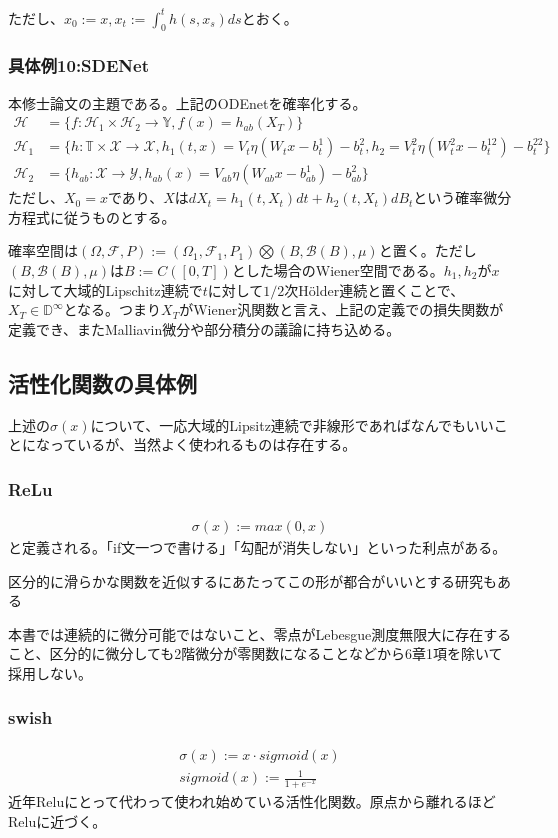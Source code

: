 \documentclass{jsarticle}
\begin{document}
ただし、$x_0:=x,x_t:=\int^t_0 h(s,x_s)ds$とおく。

\subsubsection{具体例10:SDENet}
本修士論文の主題である。上記のODEnetを確率化する。
\begin{align}
\mathcal{H}&=\{f:\mathcal{H}_1\times\mathcal{H}_2\to\mathbb{Y},f(x)=h_{ab}(X_T)\}\\
\mathcal{H}_1&=\{h:\mathbb{T}\times\mathcal{X}\to\mathcal{X},h_1(t,x)=V_t\eta(W_tx-b^1_t)-b_t^2,h_2=V^2_t\eta(W^2_tx-b^{12}_t)-b_t^{22}\}\\
\mathcal{H}_2&=\{h_{ab}:\mathcal{X}\to\mathcal{Y},h_{ab}(x)=V_{ab}\eta(W_{ab}x-b^1_{ab})-b^2_{ab}\}
\end{align}
ただし、$X_0=x$であり、$X$は$dX_t=h_1(t,X_t)dt+h_2(t,X_t)dB_t$という確率微分方程式に従うものとする。

確率空間は$(\Omega,\mathcal{F},P):=(\Omega_1,\mathcal{F}_1,P_1)\bigotimes(B,\mathcal{B}(B),\mu)$と置く。ただし$(B,\mathcal{B}(B),\mu)$は$B:=C([0,T])$とした場合のWiener空間である。$h_1,h_2$が$x$に対して大域的Lipschitz連続で$t$に対して$1/2$次Hölder連続と置くことで、$X_T\in\mathbb{D}^\infty$となる。つまり$X_T$がWiener汎関数と言え、上記の定義での損失関数が定義でき、またMalliavin微分や部分積分の議論に持ち込める。



\subsection{活性化関数の具体例}
上述の$\sigma(x)$について、一応大域的Lipsitz連続で非線形であればなんでもいいことになっているが、当然よく使われるものは存在する。

\subsubsection{ReLu}
\begin{align}
\sigma(x):=max(0,x)
\end{align}
と定義される。「if文一つで書ける」「勾配が消失しない」といった利点がある。

区分的に滑らかな関数を近似するにあたってこの形が都合がいいとする研究もある

本書では連続的に微分可能ではないこと、零点がLebesgue測度無限大に存在すること、区分的に微分しても2階微分が零関数になることなどから6章1項を除いて採用しない。

\subsubsection{swish}
\begin{align}
\sigma(x):=x\cdot sigmoid(x)\\
sigmoid(x):=\frac{1}{1+e^{-x}}
\end{align}
近年Reluにとって代わって使われ始めている活性化関数。原点から離れるほどReluに近づく。
\end{document}
